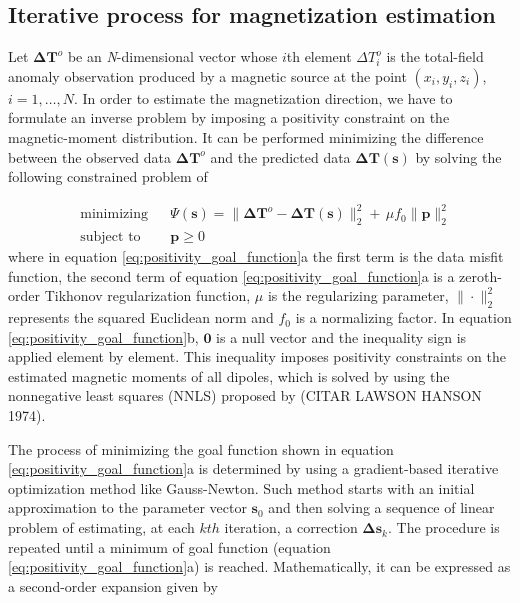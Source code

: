 \subsection{Iterative process for magnetization estimation}

Let $\mathbf{\Delta T}^o$ be an \textit{N}-dimensional vector whose $i$th element $\Delta T_i^o$ is the total-field anomaly observation produced by a magnetic source at the point $(x_i,y_i,z_i)$, $i = 1, \ldots, N$. In order to estimate the magnetization direction, we have to formulate an inverse problem by imposing a positivity constraint on the magnetic-moment distribution. It can be performed minimizing the difference between the observed data $\mathbf{\Delta T}^o$ and the predicted data $\mathbf{\Delta T} (\mathbf{s})$ by solving the following constrained problem of

\begin{subequations}
\begin{align}
& \text{minimizing}
& &\Psi(\mathbf{s}) =\lVert \mathbf{\Delta T}^o - \mathbf{\Delta T} (\mathbf{s}) \rVert_{2}^{2} + \, \mu f_0 \parallel \mathbf{p} \parallel_{2}^{2} \\
& \text{subject to}
& & \mathbf{p} \geqslant 0
\end{align}
\label{eq:positivity_goal_function}
\end{subequations}
where in equation \ref{eq:positivity_goal_function}a the first term is the data misfit function, the second term of equation \ref{eq:positivity_goal_function}a is a zeroth-order Tikhonov regularization function, $\mu$ is the regularizing parameter, $\| \cdot \|_{2}^{2}$ represents the squared Euclidean norm and $f_0$ is a normalizing factor. In equation \ref{eq:positivity_goal_function}b, $\mathbf{0}$ is a null vector and the inequality sign is applied element by element. This inequality imposes positivity constraints on the estimated magnetic moments of all dipoles, which is solved by using the nonnegative least squares (NNLS) proposed by (CITAR LAWSON HANSON 1974). 

The process of minimizing the goal function shown in equation \ref{eq:positivity_goal_function}a is determined by using a gradient-based iterative optimization method like Gauss-Newton. Such method starts with an initial approximation to the parameter vector $\mathbf{s}_0$ and then solving a sequence of linear problem of estimating, at each $kth$ iteration, a correction $\mathbf{\Delta s}_k$. The procedure is repeated until a minimum of goal function (equation \ref{eq:positivity_goal_function}a) is reached. Mathematically, it can be expressed as a second-order expansion given by


